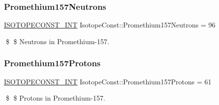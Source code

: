 \subsubsection{\texorpdfstring{Promethium157\+Neutrons}{Promethium157Neutrons}}
{\footnotesize\ttfamily \mbox{\hyperlink{group___isotope_const-_macros_ga5f18360b3e99483a35c32d789e62621c}{I\+S\+O\+T\+O\+P\+E\+C\+O\+N\+S\+T\+\_\+\+I\+NT}} Isotope\+Const\+::\+Promethium157\+Neutrons = 96}

\$ \$ Neutrons in Promethium-\/157. \mbox{\label{group___isotope_const-_promethium-_pm157_ga2dae0798b9bf8f1e6bf0e11c0b686470}} 
\subsubsection{\texorpdfstring{Promethium157\+Protons}{Promethium157Protons}}
{\footnotesize\ttfamily \mbox{\hyperlink{group___isotope_const-_macros_ga5f18360b3e99483a35c32d789e62621c}{I\+S\+O\+T\+O\+P\+E\+C\+O\+N\+S\+T\+\_\+\+I\+NT}} Isotope\+Const\+::\+Promethium157\+Protons = 61}

\$ \$ Protons in Promethium-\/157. 